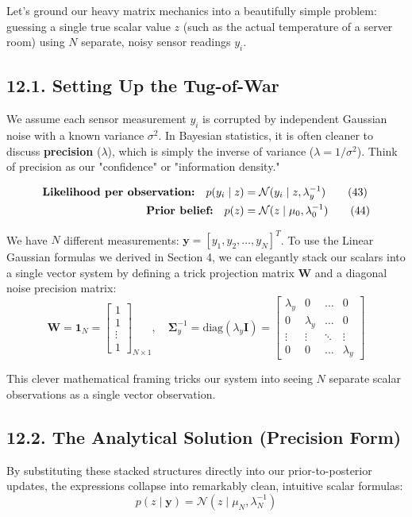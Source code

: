 \documentclass{article}
\begin{document}
Let's ground our heavy matrix mechanics into a beautifully simple problem: guessing a single true scalar value $z$ (such as the actual temperature of a server room) using $N$ separate, noisy sensor readings $y_i$. 

\subsection*{12.1. Setting Up the Tug-of-War}
We assume each sensor measurement $y_i$ is corrupted by independent Gaussian noise with a known variance $\sigma^2$. In Bayesian statistics, it is often cleaner to discuss \textbf{precision} ($\lambda$), which is simply the inverse of variance ($\lambda = 1/\sigma^2$). Think of precision as our "confidence" or "information density."

\begin{align}
\text{\textbf{Likelihood per observation:}} \quad p(y_i \mid z) &= \mathcal{N}(y_i \mid z, \lambda_y^{-1}) \tag{43} \\
\text{\textbf{Prior belief:}} \quad p(z) &= \mathcal{N}(z \mid \mu_0, \lambda_0^{-1}) \tag{44}
\end{align}

We have $N$ different measurements: $\mathbf{y} = [y_1, y_2, \dots, y_N]^T$. To use the Linear Gaussian formulas we derived in Section 4, we can elegantly stack our scalars into a single vector system by defining a trick projection matrix $\mathbf{W}$ and a diagonal noise precision matrix:
\begin{equation*}
\mathbf{W} = \mathbf{1}_N = \begin{bmatrix} 1 \\ 1 \\ \vdots \\ 1 \end{bmatrix}_{N \times 1}, \quad \boldsymbol{\Sigma}_y^{-1} = \text{diag}(\lambda_y \mathbf{I}) = \begin{bmatrix} \lambda_y & 0 & \dots & 0 \\ 0 & \lambda_y & \dots & 0 \\ \vdots & \vdots & \ddots & \vdots \\ 0 & 0 & \dots & \lambda_y \end{bmatrix}
\end{equation*}

This clever mathematical framing tricks our system into seeing $N$ separate scalar observations as a single vector observation. 

\subsection*{12.2. The Analytical Solution (Precision Form)}
By substituting these stacked structures directly into our prior-to-posterior updates, the expressions collapse into remarkably clean, intuitive scalar formulas:
\begin{equation}
p(z \mid \mathbf{y}) = \mathcal{N}(z \mid \mu_N, \lambda_N^{-1}) \tag{45}
\end{equation}
\end{document}
